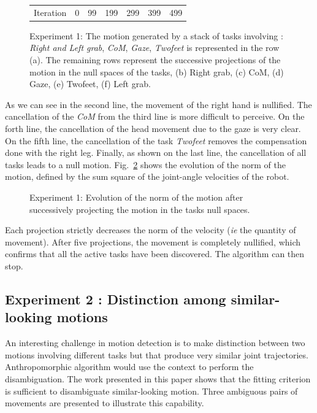 \documentclass[journal]{IEEEtran}
\begin{document}
\begin{figure}[t]
\begin{tabular}{c@{}c@{}c@{}c@{}c@{}c@{}c}
\\
Iteration & 0 & 99 & 199 & 299 & 399 & 499\\
\end{tabular}
\caption{Experiment 1: The motion generated by a stack of tasks involving :
\emph{Right and Left grab}, \emph{CoM}, \emph{Gaze}, \emph{Twofeet} is represented in the row (a).
The remaining rows represent the successive projections of the motion in the null spaces of the tasks,
(b) Right grab, (c) CoM, (d) Gaze, (e) Twofeet, (f) Left grab.}
\label{fig:snapshotXpqdot}
\end{figure}
As we can see in the second line, the movement of the right hand is nullified. The cancellation of
the \emph{CoM} from the third line is more difficult to perceive. On the forth line, the cancellation
of the head movement due to the gaze is very clear. On the fifth line, the cancellation of the task \emph{Twofeet}
removes the compensation done with the right leg. Finally, as shown on the last line,
the cancellation of all tasks leads to a null motion.
Fig.~\ref{fig:xp3Pqdot} shows the evolution of the norm of the motion,
defined by the sum square of the joint-angle velocities of the robot.
\begin{figure}[t]
\begin{center}
\resizebox{.4\textwidth}{!} {
      
    }
\end{center}
\caption{Experiment 1: Evolution of the norm of the motion after successively projecting the motion in the
	tasks null spaces.}
\label{fig:xp3Pqdot}
\end{figure}
Each projection strictly decreases the norm of the velocity (\emph{ie} the quantity of  movement). After
five projections, the movement is completely nullified, which confirms that all the active tasks have been
discovered. The algorithm can then stop.

\subsection{Experiment 2 : Distinction among similar-looking motions}
\label{sec:distinc}
An interesting challenge in motion detection
is to make distinction between two motions
involving different tasks but that produce very similar joint trajectories.
Anthropomorphic algorithm would use the context to perform the disambiguation.
The work presented in this paper shows that the fitting criterion
is sufficient to disambiguate similar-looking motion. Three ambiguous pairs of movements
are presented to illustrate this capability.
\end{document}

